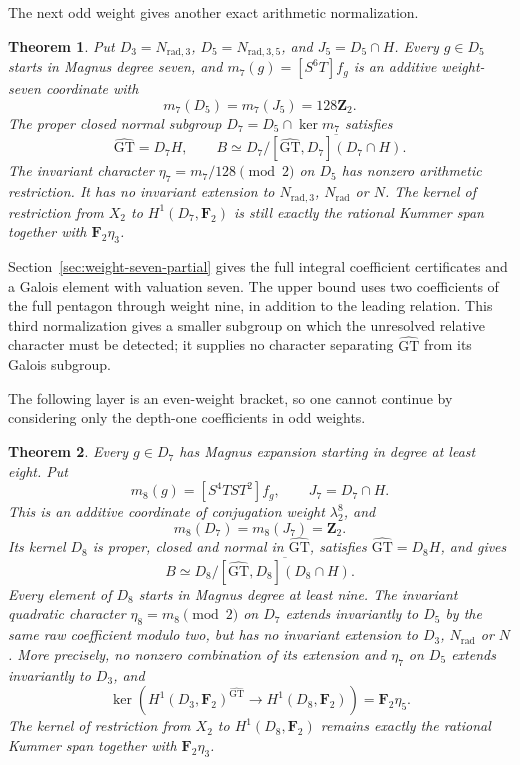 \documentclass[11pt,a4paper]{article}
\newtheorem{theorem}{Theorem}[section]
\theoremstyle{definition}
\theoremstyle{remark}
\newcommand{\GT}{\widehat{\mathrm{GT}}}
\newcommand{\Z}{\mathbf Z}
\newcommand{\F}{\mathbf F}
\begin{document}
The next odd weight gives another exact arithmetic normalization.

\begin{theorem}\label{thm:main-weight-seven-alternative}
Put $D_3=N_{\mathrm{rad},3}$, $D_5=N_{\mathrm{rad},3,5}$,
and $J_5=D_5\cap H$.
Every $g\in D_5$ starts in Magnus degree seven, and
$m_7(g)=[S^6T]f_g$ is an additive weight-seven coordinate with
\[
 m_7(D_5)=m_7(J_5)=128\Z_2.
\]
The proper closed normal subgroup $D_7=D_5\cap\ker m_7$ satisfies
\[
 \GT=D_7H,\qquad
 B\simeq D_7/\overline{[\GT,D_7](D_7\cap H)}.
\]
The invariant character $\eta_7=m_7/128\pmod2$ on $D_5$ has
nonzero arithmetic restriction. It has no invariant extension to
$N_{\mathrm{rad},3}$, $N_{\mathrm{rad}}$ or $N$.
The kernel of restriction from $X_2$ to $H^1(D_7,\F_2)$ is still
exactly the rational Kummer span together with $\F_2\eta_3$.
\end{theorem}

Section~\ref{sec:weight-seven-partial} gives the full integral
coefficient certificates and a Galois element with valuation seven.
The upper bound uses two coefficients of the full pentagon through
weight nine, in addition to the leading relation. This third
normalization gives a smaller subgroup on which the unresolved
relative character must be detected; it supplies no character
separating $\GT$ from its Galois subgroup.

The following layer is an even-weight bracket, so one cannot continue
by considering only the depth-one coefficients in odd weights.

\begin{theorem}\label{thm:main-weight-eight-normalization}
Every $g\in D_7$ has Magnus expansion starting in degree at least eight.
Put
\[
 m_8(g)=[S^4TST^2]f_g,\qquad J_7=D_7\cap H.
\]
This is an additive coordinate of conjugation weight $\lambda_2^8$,
and
\[
 m_8(D_7)=m_8(J_7)=\Z_2.
\]
Its kernel $D_8$ is proper, closed and normal in $\GT$, satisfies
$\GT=D_8H$, and gives
\[
 B\simeq D_8/\overline{[\GT,D_8](D_8\cap H)}.
\]
Every element of $D_8$ starts in Magnus degree at least nine.
The invariant quadratic character $\eta_8=m_8\pmod2$ on $D_7$
extends invariantly to $D_5$ by the same raw coefficient modulo two,
but has no invariant extension to $D_3$, $N_{\mathrm{rad}}$ or $N$.
More precisely, no nonzero combination of its extension and $\eta_7$
on $D_5$ extends invariantly to $D_3$, and
\[
 \ker\!\left(H^1(D_3,\F_2)^{\GT}\longrightarrow H^1(D_8,\F_2)\right)
 =\F_2\eta_5.
\]
The kernel of restriction from $X_2$ to $H^1(D_8,\F_2)$ remains
exactly the rational Kummer span together with $\F_2\eta_3$.
\end{theorem}
\end{document}
